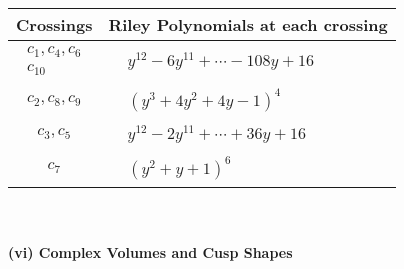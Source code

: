 \documentclass[1p]{elsarticle_modified}
\theoremstyle{definition}
\begin{document}
\begin{tabular}{m{50pt}|m{274pt}}
Crossings & \hspace{64pt}Riley Polynomials at each crossing \\
\hline $$\begin{aligned}c_{1},c_{4},c_{6}\\c_{10}\end{aligned}$$&$\begin{aligned}
&y^{12}-6 y^{11}+\cdots-108 y+16
\end{aligned}$\\
\hline $$\begin{aligned}c_{2},c_{8},c_{9}\end{aligned}$$&$\begin{aligned}
&(y^3+4 y^2+4 y-1)^4
\end{aligned}$\\
\hline $$\begin{aligned}c_{3},c_{5}\end{aligned}$$&$\begin{aligned}
&y^{12}-2 y^{11}+\cdots+36 y+16
\end{aligned}$\\
\hline $$\begin{aligned}c_{7}\end{aligned}$$&$\begin{aligned}
&(y^2+y+1)^6
\end{aligned}$\\
\hline
\end{tabular}\\~\\
\newpage\flushleft \textbf{(vi) Complex Volumes and Cusp Shapes}
\end{document}
